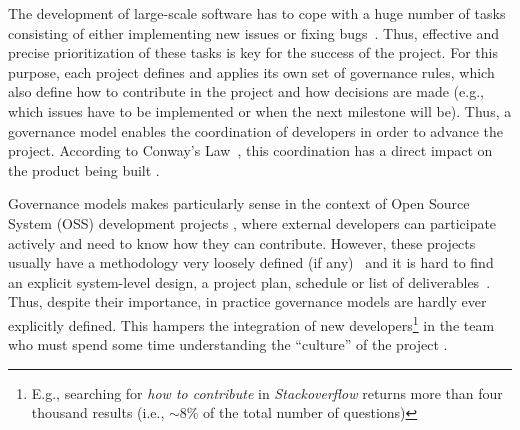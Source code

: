 The development of large-scale software has to cope with a huge number of tasks consisting of either implementing new issues or fixing bugs~\cite{Aranda2009}. Thus, effective and precise prioritization of these tasks is key for the success of the project. For this purpose, each project defines and applies its own set of governance rules, which also define how to contribute in the project and how decisions are made (e.g., which issues have to be implemented or when the next milestone will be). Thus, a governance model enables the coordination of developers in order to advance the project. According to Conway's Law~\cite{Conway1968}, this coordination has a direct impact on the product being built \cite{Herbsleb1999}.  

Governance models makes particularly sense in the context of Open Source System (OSS) development projects \cite{osswatch}, where external developers can participate actively and need to know how they can contribute. However, these projects usually have a methodology very loosely defined (if any)~\cite{McConnell1999} and it is hard to find an explicit system-level design, a project plan, schedule or list of deliverables~\cite{Mockus}. Thus, despite their importance, in practice governance models are hardly ever explicitly defined. This hampers the integration of new developers\footnote{E.g., searching for \emph{how to contribute} in \emph{Stackoverflow} returns more than four thousand results (i.e., $\sim$8\% of the total number of questions)} in the team who must spend some time understanding the ``culture'' of the project \cite{Shibuya2009}. 



